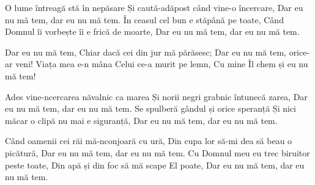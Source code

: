\beginverse
O lume întreagă stă în nepăsare
Și caută-adăpost când vine-o încercare,
Dar eu nu mă tem, dar eu nu mă tem.
În ceasul cel bun e stăpână pe toate,
Când Domnul îi vorbește îi e frică de moarte,
Dar eu nu mă tem, dar eu nu mă tem.
\endverse

\beginchorus
Dar eu nu mă tem,
Chiar dacă cei din jur mă părăsesc;
Dar eu nu mă tem, orice-ar veni!
Viața mea e-n mâna Celui ce-a murit pe lemn,
Cu mine Îl chem și eu nu mă tem!
\endchorus

\beginverse
Ades vine-ncercarea năvalnic ca marea
Și norii negri grabnic întunecă zarea,
Dar eu nu mă tem, dar eu nu mă tem.
Se spulberă gândul și orice speranță
Și nici măcar o clipă nu mai e siguranță,
Dar eu nu mă tem, dar eu nu mă tem.
\endverse

\beginverse
Când oamenii cei răi mă-nconjoară cu ură,
Din cupa lor să-mi dea să beau o picătură,
Dar eu nu mă tem, dar eu nu mă tem.
Cu Domnul meu eu trec biruitor peste toate,
Din apă și din foc să mă scape El poate,
Dar eu nu mă tem, dar eu nu mă tem.
\endverse
\endsong